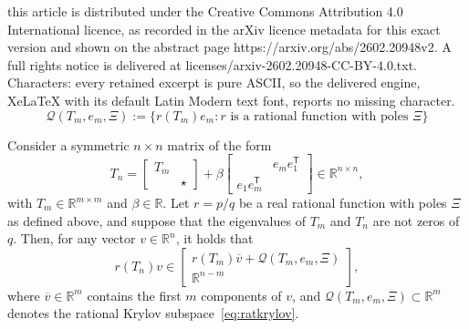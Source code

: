\documentclass[10pt,a4paper]{amsart}
\newcommand{\R}{\mathbb{R}}
\newcommand{\T}{\mathsf{T}}
\newcommand{\defi}{:=}
\begin{document}
this article is distributed under the Creative Commons Attribution 4.0 International licence, as recorded in the arXiv licence metadata for this exact version and shown on the abstract page https://arxiv.org/abs/2602.20948v2. A full rights notice is delivered at licenses/arxiv-2602.20948-CC-BY-4.0.txt. Characters: every retained excerpt is pure ASCII, so the delivered engine, XeLaTeX with its default Latin Modern text font, reports no missing character.
\begin{equation}
    \mathcal{Q}(T_{m},e_m,\Xi)  \defi \bigl\{ r(T_m)e_m \colon \text{$r$ is a rational function with poles $\Xi$} \bigr\}   \label{eq:ratkrylov}
\end{equation}

\begin{lemma}\label{thm:BKCS}
   Consider a symmetric $n\times n$
   matrix of the form
      \begin{equation*}
         T_{n}=\begin{bmatrix}
             T_{m}&\\& \star
         \end{bmatrix} + \beta \begin{bmatrix}
             &e_me_1^{\T}\\e_1e_m^{\T} &
         \end{bmatrix}\in \R^{n\times n},
     \end{equation*}
     with $T_{m} \in \R^{m \times m}$ and $\beta \in \R$.
     Let $r = p/q$ be a real rational function with poles $\Xi$ as defined above, and suppose that the eigenvalues
     of $T_m$ and $T_n$ are not zeros of $q$. Then, for any vector $v\in \R^{n}$, it holds that
     \begin{equation*}
         r(T_{n})  v \in
         \begin{bmatrix}
            r(T_{m})  \overline{v} + \mathcal{Q}(T_{m},e_m,\Xi) \\
              \R^{n-m}
         \end{bmatrix},
     \end{equation*}
     where $\overline{v}\in \R^m$ contains the first $m$ components of $v$, and $\mathcal{Q}(T_{m},e_m,\Xi)\subset \R^{m}$ denotes the rational Krylov subspace~\eqref{eq:ratkrylov}. 
\end{lemma}   
\end{document}
